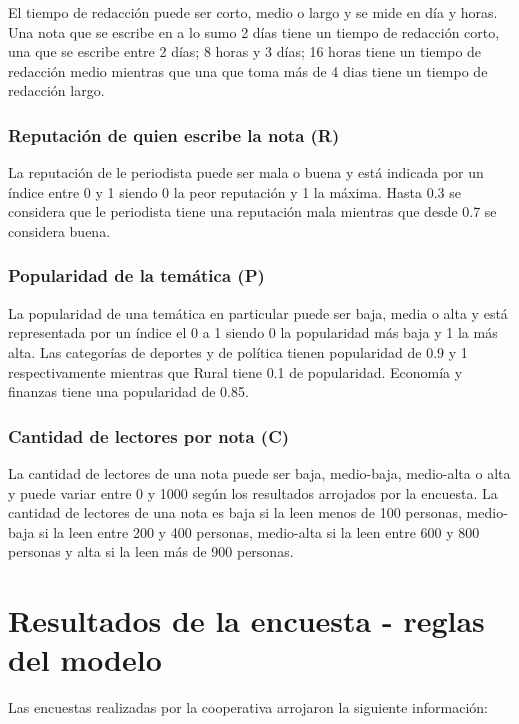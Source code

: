 \documentclass{article}
\begin{document}
El tiempo de redacción puede ser corto, medio o largo y se mide en día y horas. Una nota que se escribe en a lo sumo 2 días tiene un tiempo de redacción corto, una que se escribe entre 2 días; 8 horas y 3 días; 16 horas tiene un tiempo de redacción medio mientras que una que toma más de 4 dias tiene un tiempo de redacción largo.

\subsubsection*{Reputación de quien escribe la nota (R)}

La reputación de le periodista puede ser mala o buena y está indicada por un índice entre 0 y 1 siendo 0 la peor reputación y 1 la máxima. Hasta 0.3 se considera que le periodista tiene una reputación mala mientras que desde 0.7 se considera buena.

\subsubsection*{Popularidad de la temática (P)}

La popularidad de una temática en particular puede ser baja, media o alta y está representada por un índice el 0 a 1 siendo 0 la popularidad más baja y 1 la más alta. Las categorías de deportes y de política tienen popularidad de 0.9 y 1 respectivamente mientras que Rural tiene 0.1 de popularidad. Economía y finanzas tiene una popularidad de 0.85.

\subsubsection*{Cantidad de lectores por nota (C)}

La cantidad de lectores de una nota puede ser baja, medio-baja, medio-alta o alta y puede variar entre 0 y 1000 según los resultados arrojados por la encuesta. La cantidad de lectores de una nota es baja si la leen menos de 100 personas, medio-baja si la leen entre 200 y 400 personas, medio-alta si la leen entre 600 y 800 personas y alta si la leen más de 900 personas.


\pagebreak
\section*{Resultados de la encuesta - reglas del modelo}

Las encuestas realizadas por la cooperativa arrojaron la siguiente información:
\end{document}
